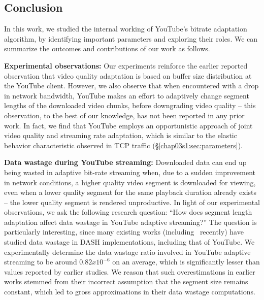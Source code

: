 \subsection{Conclusion}
\label{chap03s1:sec:conclusion}

In this work, we studied the internal working of YouTube's bitrate adaptation algorithm, by identifying important parameters and exploring their roles.
We can summarize the outcomes and contributions of our work as follows.

{\bf Experimental observations:} Our experiments reinforce the earlier reported observation that video quality adaptation is based on buffer size distribution at the YouTube client.
However, we also observe that when encountered with a drop in network bandwidth, YouTube makes an effort to adaptively change segment lengths of the downloaded video chunks, before downgrading video quality -- this observation, to the best of our knowledge, has not been reported in any prior work.
In fact, we find that YouTube employs an opportunistic approach of joint video quality and streaming rate adaptation, which is similar to the elastic behavior characteristic  observed in TCP traffic (\S\ref{chap03s1:sec:parameters}).

{\bf Data wastage during YouTube streaming:} Downloaded data can end up being wasted in adaptive bit-rate streaming when, due to a sudden improvement in network conditions, a higher quality video segment is downloaded for viewing, even when a lower quality segment for the same playback duration already exists -- the lower quality segment is rendered unproductive.
In light of our experimental observations, we ask the following research question: ``How does segment length adaptation affect data wastage in YouTube adaptive streaming?''
The question is particularly interesting, since many existing works (including~\cite{sieber2016sacrificing} recently) have studied data wastage in DASH implementations, including that of YouTube.
We experimentally determine the data wastage ratio involved in YouTube adaptive streaming to be around $0.82x10^{-6}$ on an average, which is significantly lesser than values reported by earlier studies.%
We reason that such overestimations in earlier works stemmed from their incorrect assumption that the segment size remains constant, which led to gross approximations in their data wastage computations.

